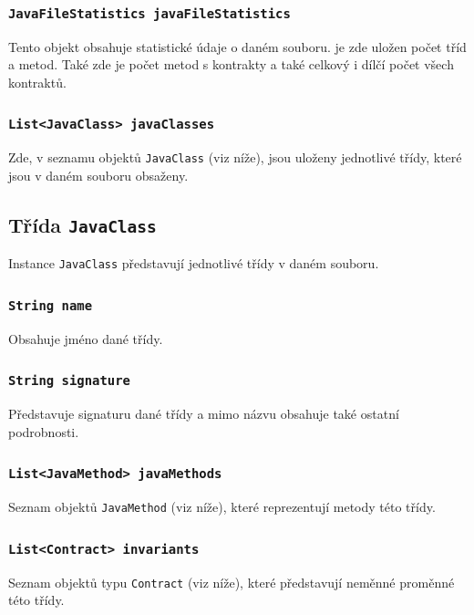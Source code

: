 				\subsubsection{\texttt{JavaFileStatistics javaFileStatistics}}
					Tento objekt obsahuje statistické údaje o daném souboru. je zde uložen počet tříd a metod. Také zde je počet metod s kontrakty a také celkový i dílčí počet všech kontraktů.
					
				\subsubsection{\texttt{List<JavaClass> javaClasses}}
					Zde, v seznamu objektů \texttt{JavaClass} (viz níže), jsou uloženy jednotlivé třídy, které jsou v daném souboru obsaženy.
			
			
			\subsection{Třída \texttt{JavaClass}}
				Instance \texttt{JavaClass} představují jednotlivé třídy v daném souboru.
				
				\subsubsection{\texttt{String name}}				
					Obsahuje jméno dané třídy.
			
				\subsubsection{\texttt{String signature}}				
					Představuje signaturu dané třídy a mimo názvu obsahuje také ostatní podrobnosti.
					
				\subsubsection{\texttt{List<JavaMethod> javaMethods}}
					Seznam objektů \texttt{JavaMethod} (viz níže), které reprezentují metody této třídy.
					
				\subsubsection{\texttt{List<Contract> invariants}}
					Seznam objektů typu \texttt{Contract} (viz níže), které představují neměnné proměnné této třídy.
			
